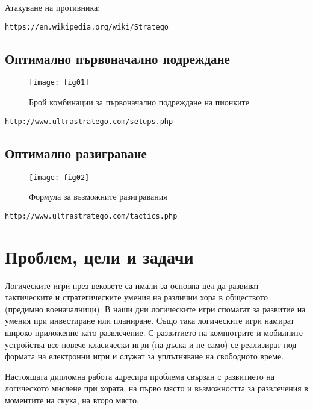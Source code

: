 Атакуване на противника:

\begin{lstlisting}
https://en.wikipedia.org/wiki/Stratego
\end{lstlisting}

\subsection{Оптимално първоначално подреждане}

\begin{figure}[h!]
 \centering
 \texttt{[image: fig01]}
 \caption{Брой комбинации за първоначално подреждане на пионките \cite{arts01}}
\label{figure01}
\end{figure}
\FloatBarrier

\begin{lstlisting}
http://www.ultrastratego.com/setups.php
\end{lstlisting}

\subsection{Оптимално разиграване}

\begin{figure}[h!]
 \centering
 \texttt{[image: fig02]}
 \caption{Формула за възможните разигравания \cite{arts01}}
\label{figure02}
\end{figure}
\FloatBarrier

\begin{lstlisting}
http://www.ultrastratego.com/tactics.php
\end{lstlisting}

\section{Проблем, цели и задачи}

Логическите игри през вековете са имали за основна цел да развиват тактическите и стратегическите умения на различни хора в обществото (предимно военачалници). В наши дни логическите игри спомагат за развитие на умения при инвестиране или планиране. Също така логическите игри намират широко приложение като развлечение. С развитието на компютрите и мобилните устройства все повече класически игри (на дъска и не само) се реализират под формата на електронни игри и служат за уплътняване на свободното време. 

Настоящата дипломна работа адресира проблема свързан с развитието на логическото мислене при хората, на първо място и възможността за развлечения в моментите на скука, на второ място. 

